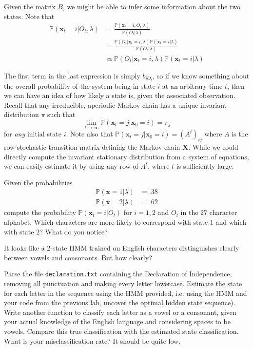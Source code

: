 Given the matrix $B$, we might be able to infer some information about the two states. Note that
\begin{align*}
\mathbb{P}(\mathbf{x}_{t} = i | O_{t},\lambda) & = \frac{\mathbb{P}(\mathbf{x}_{t} = i, O_{t} | \lambda)}{\mathbb{P}(O_{t} | \lambda)} \\
& = \frac{\mathbb{P}(O_{t} | \mathbf{x}_{t} = i, \lambda) \mathbb{P}(\mathbf{x}_{t} = i | \lambda)}{\mathbb{P}(O_{t} | \lambda)} \\
& \propto \mathbb{P}(O_{t} | \mathbf{x}_{t} = i, \lambda) \mathbb{P}(\mathbf{x}_{t} = i| \lambda)
\end{align*}

The first term in the last expression is simply $b_{iO_{t}}$, so if we know something about the overall probability of the system being in state $i$ at an arbitrary time $t$, then we can have an idea of how likely a state is, given the associated observation. Recall that any irreducible, aperiodic Markov chain has a unique invariant distribution $\pi$ such that
\begin{equation*}
\lim_{t \rightarrow \infty} \mathbb{P}(\mathbf{x}_{t} = j | \mathbf{x}_{0} = i) = \pi_{j}
\end{equation*}
for \emph{any} initial state $i$. Note also that $\mathbb{P}(\mathbf{x}_{t} = j | \mathbf{x}_{0} = i) = (A^{t})_{ij}$ where $A$ is the row-stochastic transition matrix defining the Markov chain $\mathbf{X}$. While we could directly compute the invariant stationary distribution from a system of equations, we can easily estimate it by using any row of $A^{t}$, where $t$ is sufficiently large.

\begin{problem}
Given the probabilities
\begin{align*}
\mathbb{P}(\mathbf{x} = 1 | \lambda) & = .38 \\
\mathbb{P}(\mathbf{x} = 2 | \lambda) & = .62
\end{align*}
compute the probability $\mathbb{P}(\mathbf{x}_{t} = i | O_{t})$ for $i = 1,2$ and $O_{t}$ in the $27$ character alphabet. Which characters are more likely to correspond with state $1$ and which with state $2$? What do you notice?
\end{problem}
It looks like a $2$-state HMM trained on English characters distinguishes clearly between vowels and consonants. But how clearly?

\begin{problem}
Parse the file \texttt{declaration.txt} containing the Declaration of Independence, removing all punctuation and making every letter lowercase. Estimate the state for each letter in the sequence using the HMM provided, i.e. using the HMM and your code from the previous lab, uncover the optimal hidden state sequence). Write another function to classify each letter as a vowel or a consonant, given your actual knowledge of the English language and considering spaces to be vowels. Compare this true classification with the estimated state classification. What is your misclassification rate? It should be quite low.
\end{problem}
